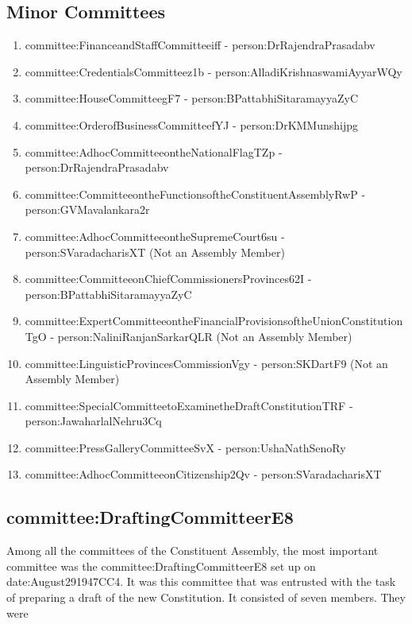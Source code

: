 \subsection{Minor Committees}

\begin{enumerate}
  \item \gls{committee:FinanceandStaffCommitteeiff} - \gls{person:DrRajendraPrasadabv}
  \item \gls{committee:CredentialsCommitteez1b} - \gls{person:AlladiKrishnaswamiAyyarWQy}
  \item \gls{committee:HouseCommitteegF7} - \gls{person:BPattabhiSitaramayyaZyC}
  \item \gls{committee:OrderofBusinessCommitteefYJ} - \gls{person:DrKMMunshijpg}
  \item \gls{committee:AdhocCommitteeontheNationalFlagTZp} - \gls{person:DrRajendraPrasadabv}
  \item \gls{committee:CommitteeontheFunctionsoftheConstituentAssemblyRwP} - \gls{person:GVMavalankara2r}
  \item \gls{committee:AdhocCommitteeontheSupremeCourt6su} - \gls{person:SVaradacharisXT} (Not an Assembly Member)
  \item \gls{committee:CommitteeonChiefCommissionersProvinces62I} - \gls{person:BPattabhiSitaramayyaZyC}
  \item \gls{committee:ExpertCommitteeontheFinancialProvisionsoftheUnionConstitutionTgO} - \gls{person:NaliniRanjanSarkarQLR} (Not an Assembly Member)
  \item \gls{committee:LinguisticProvincesCommissionVgy} - \gls{person:SKDartF9} (Not an Assembly Member)
  \item \gls{committee:SpecialCommitteetoExaminetheDraftConstitutionTRF} - \gls{person:JawaharlalNehru3Cq}
  \item \gls{committee:PressGalleryCommitteeSvX} - \gls{person:UshaNathSenoRy}
  \item \gls{committee:AdhocCommitteeonCitizenship2Qv} - \gls{person:SVaradacharisXT}
\end{enumerate}


\subsection{\gls{committee:DraftingCommitteerE8}}

Among all the committees of the Constituent Assembly, the most important committee was the \gls{committee:DraftingCommitteerE8} set up on \gls{date:August291947CC4}. It was this committee that was entrusted with the task of preparing a draft of the new Constitution. It consisted of seven members. They were


